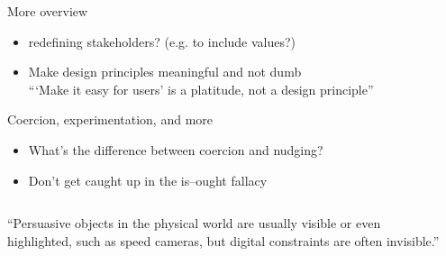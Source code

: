 \documentclass[presentation]{subfiles}
\begin{document}
\begin{frame}{More overview}
    \begin{itemize}
      \item redefining stakeholders? (e.g. to include \alert{values}?)
      \item Make design principles meaningful and not dumb\\
      \footnotesize{```Make it easy for users' is a platitude, not a design principle''}
    \end{itemize}
\end{frame}

\begin{frame}{Coercion, experimentation, and more}
\begin{itemize}
  \item What's the difference between \alert{coercion} and \alert{nudging}?
  \item Don't get caught up in the \alert{is--ought fallacy}
\end{itemize}

\vspace{5mm}

\begin{columns}[t]
\begin{column}{0.45\textwidth}
``Persuasive objects in the physical world are usually visible or even highlighted, such as speed cameras, but digital constraints are often invisible.''
\end{column}

\begin{column}{0.45\textwidth}

\end{column}

\end{columns}

\end{frame}
\end{document}
